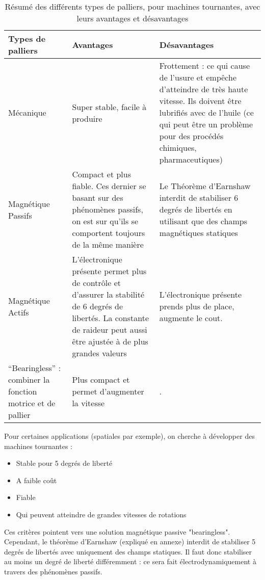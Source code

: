 \begin{table}[H]
    \centering
    \begin{tabular}{|p{3cm}|p{5cm}|p{5cm}|}
    \hline
        Types de palliers & Avantages & D\'esavantages \\
        \hline
        \hline
        Mécanique & Super stable, facile à produire  & Frottement : ce qui cause de l'usure et empêche d'atteindre de très haute vitesse. Ils doivent être lubrifiés avec de l'huile (ce qui peut être un problème pour des procédés chimiques, pharmaceutiques) \\
        \hline
        Magnétique Passifs & Compact et plus fiable. Ces dernier se basant sur des phénomènes passifs, on est sur qu'ils se comportent toujours de la même manière 
        & Le Théorème d'Earnshaw interdit de stabiliser 6 degrés de libertés en utilisant que des champs magnétiques statiques 
        \\
        \hline
        Magnétique Actifs & L'\'electronique pr\'esente permet plus de contrôle et d'assurer la stabilité de 6 degrés de libertés. La constante de raideur peut aussi être ajustée à de plus grandes valeurs  & L'électronique présente prends plus de place, augmente le cout. \\
        \hline
        ``Bearingless'' : combiner la fonction motrice et de pallier & Plus compact et permet d'augmenter la vitesse  &  .\\
        \hline
    \end{tabular}
    \caption{Résumé des différents types de palliers, pour machines tournantes, avec leurs avantages et désavantages}
    \label{tab:Bearings}
\end{table}

Pour certaines applications (spatiales par exemple), on cherche à développer des machines tournantes :
\begin{itemize}
    \item Stable pour 5 degrés de liberté
    \item A faible coût
    \item Fiable 
    \item Qui peuvent atteindre de grandes vitesses de rotations
\end{itemize}

Ces critères pointent vers une solution magnétique passive "bearingless". Cependant, le théorème d'Earnshaw (expliqué en annexe) interdit de stabiliser 5 degrés de libertés avec uniquement des champs statiques. Il faut donc stabiliser au moins un degré de liberté différemment : ce sera fait électrodynamiquement à travers des phénomènes passifs.




